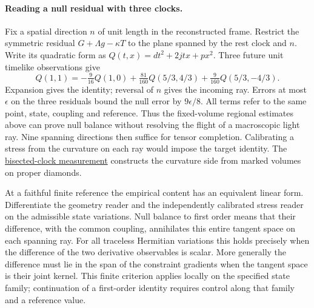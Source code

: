 \documentclass[11pt]{article}
\begin{document}
\paragraph{Reading a null residual with three clocks.}
\label{par:ray-pair-transfer}
Fix a spatial direction $n$ of unit length in the reconstructed frame.
Restrict the symmetric residual $G+\Lambda g-\kappa T$ to the plane
spanned by the rest clock and $n$. Write its quadratic form as
$Q(t,x)=dt^2+2jtx+px^2$. Three future unit timelike observations give
\[
 Q(1,1)=-\tfrac9{16}Q(1,0)
 +\tfrac{81}{160}Q(5/3,4/3)+\tfrac9{160}Q(5/3,-4/3).
\]
Expansion gives the identity; reversal of $n$ gives the incoming ray.
Errors at most $\epsilon$ on the three residuals bound the null error by
$9\epsilon/8$. All terms refer to the same point, state, coupling and
reference. Thus the fixed-volume regional estimates above can prove null
balance without resolving the flight of a macroscopic light ray. Nine
spanning directions then suffice for tensor completion. Calibrating a
stress from the curvature on each ray would impose the target identity.
The \hyperref[par:bisected-null-curvature]{bisected-clock measurement}
constructs the curvature side from marked volumes on proper diamonds.

At a faithful finite reference the empirical content has an equivalent
linear form. Differentiate the geometry reader and the independently
calibrated stress reader on the admissible state variations. Null balance
to first order means that their difference, with the common coupling,
annihilates this entire tangent space on each spanning ray. For all
traceless Hermitian variations this holds precisely when the difference
of the two derivative observables is scalar. More generally the
difference must lie in the span of the constraint gradients when the
tangent space is their joint kernel. This finite criterion applies
locally on the specified state family; continuation of a first-order
identity requires control along that family and a reference value.
\end{document}

